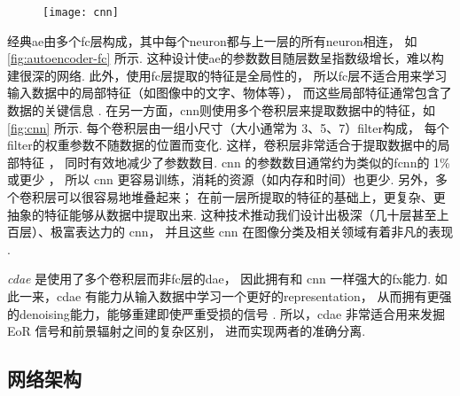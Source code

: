 \begin{figure}[htp]
  \centering
  \texttt{[image: cnn]}
  \label{fig:cnn}
\end{figure}

经典\ac{ae}由多个\ac{fc}层构成，其中每个\ac{neuron}都与上一层的所有\ac{neuron}相连，
如\autoref{fig:autoencoder-fc} 所示.
这种设计使\ac{ae}的参数数目随层数呈指数级增长，难以构建很深的网络.
此外，使用\ac{fc}层提取的特征是全局性的，
所以\ac{fc}层不适合用来学习输入数据中的局部特征（如图像中的文字、物体等），
而这些局部特征通常包含了数据的关键信息 \cite{masci2011}.
在另一方面，\ac{cnn}则使用多个卷积层来提取数据中的特征，如\autoref{fig:cnn} 所示.
每个卷积层由一组小尺寸（大小通常为 3、5、7）\ac{filter}构成，
每个\ac{filter}的权重参数不随数据的位置而变化.
这样，卷积层非常适合于提取数据中的局部特征 \cite{leCun1998}，
同时有效地减少了参数数目.
\ac{cnn} 的参数数目通常约为类似的\ac{fc}\ac{nn}的 1\% 或更少 \cite{grais2017}，
所以 \ac{cnn} 更容易训练，消耗的资源（如内存和时间）也更少.
另外，多个卷积层可以很容易地堆叠起来；
在前一层所提取的特征的基础上，更复杂、更抽象的特征能够从数据中提取出来.
这种技术推动我们设计出极深（几十层甚至上百层）、极富表达力的 \ac{cnn}，
并且这些 \ac{cnn} 在图像分类及相关领域有着非凡的表现
\cite{krizhevsky2012,simonyan2014,szegedy2015,ma2019}.

\emph{\ac{cdae}} 是使用了多个卷积层而非\ac{fc}层的\ac{dae}，
因此拥有和 \ac{cnn} 一样强大的\ac{fx}能力.
如此一来，\ac{cdae} 有能力从输入数据中学习一个更好的\ac{representation}，
从而拥有更强的\ac{denoising}能力，能够重建即使严重受损的信号 \cite{du2017}.
所以，\ac{cdae} 非常适合用来发掘 EoR 信号和前景辐射之间的复杂区别，
进而实现两者的准确分离.

\subsection{网络架构}
\label{sec:architecture}

